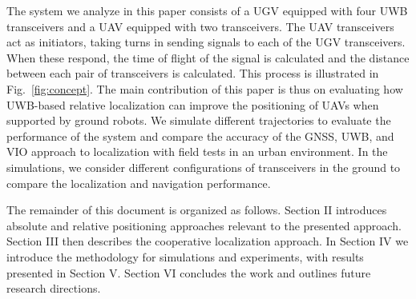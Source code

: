 The system we analyze in this paper consists of a UGV equipped with four UWB transceivers and a UAV equipped with two transceivers. The UAV transceivers act as initiators, taking turns in sending signals to each of the UGV transceivers. When these respond, the time of flight of the signal is calculated and the distance between each pair of transceivers is calculated. This process is illustrated in Fig.~\ref{fig:concept}. The main contribution of this paper is thus on evaluating how UWB-based relative localization can improve the positioning of UAVs when supported by ground robots. We simulate different trajectories to evaluate the performance of the system and compare the accuracy of the GNSS, UWB, and VIO approach to localization with field tests in an urban environment. In the simulations, we consider different configurations of transceivers in the ground to compare the localization and navigation performance.

The remainder of this document is organized as follows. Section II introduces absolute and relative positioning approaches relevant to the presented approach. Section III then describes the cooperative localization approach. In Section IV we introduce the methodology for simulations and experiments, with results presented in Section V. Section VI concludes the work and outlines future research directions.